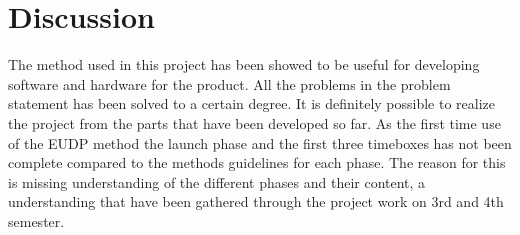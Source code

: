 \chapter{Discussion}
%
The method used in this project has been showed to be useful for developing software and hardware for the product. All the problems in the problem statement has been solved to a certain degree. It is definitely possible to realize the project from the parts that have been developed so far. As the first time use of the EUDP method the launch phase and the first three timeboxes has not been complete compared to the methods guidelines for each phase. The reason for this is missing understanding of the different phases and their content, a understanding that have been gathered through the project work on 3rd and 4th semester.